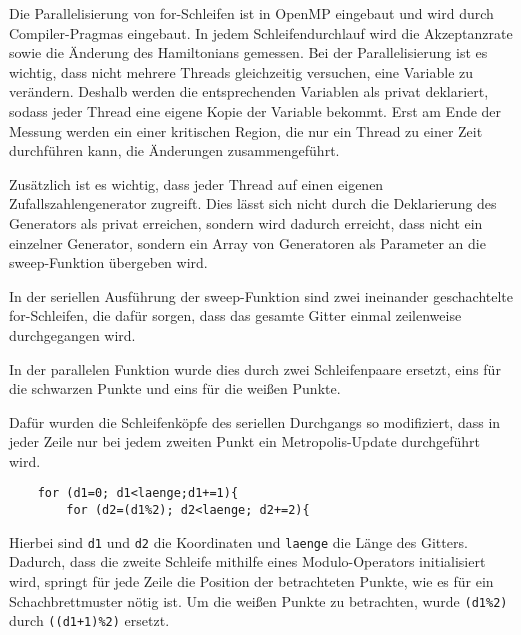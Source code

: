 	Die Parallelisierung von for-Schleifen ist in OpenMP eingebaut und wird durch Compiler-Pragmas eingebaut. In jedem Schleifendurchlauf wird die Akzeptanzrate sowie die Änderung des Hamiltonians gemessen. Bei der Parallelisierung ist es wichtig, dass nicht mehrere Threads gleichzeitig versuchen, eine Variable zu verändern. Deshalb werden die entsprechenden Variablen als privat deklariert, sodass jeder Thread eine eigene Kopie der Variable bekommt. Erst am Ende der Messung werden ein einer kritischen Region, die nur ein Thread zu einer Zeit durchführen kann, die Änderungen zusammengeführt. 	%
	
	
	Zusätzlich ist es wichtig, dass jeder Thread auf einen eigenen Zufallszahlengenerator zugreift. Dies lässt sich nicht durch die Deklarierung des Generators als privat erreichen, sondern wird dadurch erreicht, dass nicht ein einzelner Generator, sondern ein Array von Generatoren als Parameter an die sweep-Funktion übergeben wird.
	
	In der seriellen Ausführung der sweep-Funktion sind zwei ineinander geschachtelte for-Schleifen, die dafür sorgen, dass das gesamte Gitter einmal zeilenweise durchgegangen wird.
	
	In der parallelen Funktion wurde dies durch zwei Schleifenpaare ersetzt, eins für die schwarzen Punkte und eins für die weißen Punkte.
	
	Dafür wurden die Schleifenköpfe des seriellen Durchgangs so modifiziert, dass in jeder Zeile nur bei jedem zweiten Punkt ein Metropolis-Update durchgeführt wird. 
	\begin{verbatim}
	for (d1=0; d1<laenge;d1+=1){
		for (d2=(d1%2); d2<laenge; d2+=2){
	\end{verbatim}
	Hierbei sind \texttt{d1} und \texttt{d2} die Koordinaten und \texttt{laenge} die Länge des Gitters. Dadurch, dass die zweite Schleife mithilfe eines Modulo-Operators initialisiert wird, springt für jede Zeile die Position der betrachteten Punkte, wie es für ein Schachbrettmuster nötig ist. Um die weißen Punkte zu betrachten, wurde \texttt{(d1\%2)} durch \texttt{((d1+1)\%2)} ersetzt.
	
